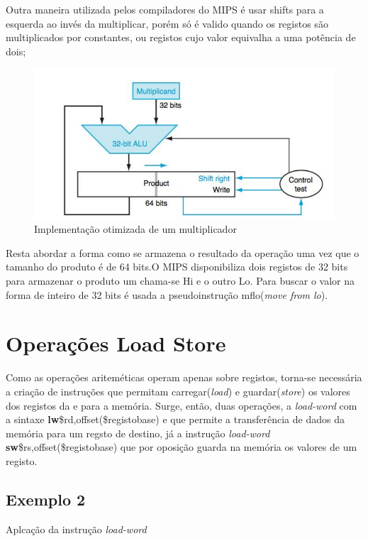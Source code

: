 \documentclass[10pt,a4paper]{book}
\begin{document}
		Outra maneira utilizada pelos compiladores do MIPS é usar shifts para a esquerda ao invés da multiplicar, porém só é valido quando os registos são multiplicados por constantes, ou registos cujo valor equivalha a uma potência de dois;

   			\begin{figure}[htp]
			    \centering
			    \includegraphics[scale=0.5]{mul2.png}
			    \caption{Implementação otimizada de um multiplicador}
			    \label{mul2}
			\end{figure}

		Resta abordar a forma como se armazena o resultado da operação uma vez que o tamanho do produto é de 64 bits.O MIPS disponibiliza dois registos de 32 bits para armazenar o produto um chama-se Hi e o outro Lo. Para buscar o valor na forma de inteiro de 32 bits é usada a pseudoinstrução mflo(\textit{move from lo}).




	\section{Operações Load Store}

	  Como as operações ariteméticas operam apenas sobre registos, torna-se necessária  a criação de instruções que permitam carregar(\textit{load}) e guardar(\textit{store}) os valores dos registos da e para a memória.
	  Surge, então, duas operações, a \textit{load-word} com a sintaxe \textbf{lw}\$rd,offset(\$registobase) e que permite a transferência de dados da memória para um regsto de destino, já a instrução \textit{load-word}  \textbf{sw}\$rs,offset(\$registobase) 	  que por oposição guarda na memória os valores de um registo.

	   \subsection{Exemplo 2}
	      Aplcação da instrução \textit{load-word}
\end{document}
